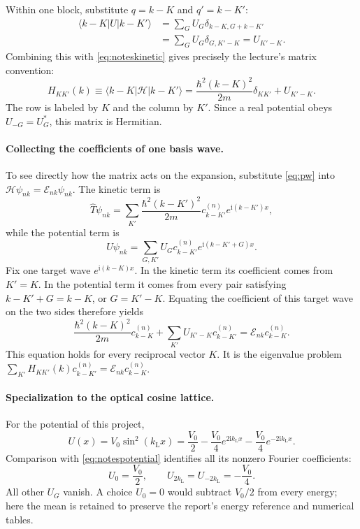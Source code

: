 \documentclass[11pt,oneside]{report}
\numberwithin{equation}{chapter}
\newcommand{\ii}{\mathrm i}
\begin{document}
Within one block, substitute $q=k-K$ and $q'=k-K'$:
\begin{align}
 \langle k-K|U|k-K'\rangle
 &=\sum_GU_G\delta_{k-K,G+k-K'}\nonumber\\
 &=\sum_GU_G\delta_{G,K'-K}=U_{K'-K}.
\end{align}
Combining this with \cref{eq:noteskinetic} gives precisely the lecture's matrix convention:
\begin{equation}\label{eq:notesmatrix}
 \boxed{H_{KK'}(k)\equiv\langle k-K|\mathcal H|k-K'\rangle
 =\frac{\hbar^2(k-K)^2}{2m}\delta_{KK'}+U_{K'-K}.}
\end{equation}
The row is labeled by $K$ and the column by $K'$. Since a real potential obeys $U_{-G}=U_G^*$, this matrix is Hermitian.

\paragraph{Collecting the coefficients of one basis wave.}
To see directly how the matrix acts on the expansion, substitute \cref{eq:pw} into $\mathcal H\psi_{nk}=\mathcal E_{nk}\psi_{nk}$. The kinetic term is
\begin{equation}
 \hat T\psi_{nk}=\sum_{K'}\frac{\hbar^2(k-K')^2}{2m}c^{(n)}_{k-K'}e^{\ii(k-K')x},
\end{equation}
while the potential term is
\begin{equation}
 U\psi_{nk}=\sum_{G,K'}U_Gc^{(n)}_{k-K'}e^{\ii(k-K'+G)x}.
\end{equation}
Fix one target wave $e^{\ii(k-K)x}$. In the kinetic term its coefficient comes from $K'=K$. In the potential term it comes from every pair satisfying $k-K'+G=k-K$, or $G=K'-K$. Equating the coefficient of this target wave on the two sides therefore yields
\begin{equation}\label{eq:notescoefficient}
 \boxed{\frac{\hbar^2(k-K)^2}{2m}c^{(n)}_{k-K}
 +\sum_{K'}U_{K'-K}c^{(n)}_{k-K'}=\mathcal E_{nk}c^{(n)}_{k-K}.}
\end{equation}
This equation holds for every reciprocal vector $K$. It is the eigenvalue problem $\sum_{K'}H_{KK'}(k)c^{(n)}_{k-K'}=\mathcal E_{nk}c^{(n)}_{k-K}$.

\paragraph{Specialization to the optical cosine lattice.}
For the potential of this project,
\begin{equation}
 U(x)=V_0\sin^2(k_{\mathrm L}x)=\frac{V_0}{2}
 -\frac{V_0}{4}e^{2\ii k_{\mathrm L}x}-\frac{V_0}{4}e^{-2\ii k_{\mathrm L}x}.
\end{equation}
Comparison with \cref{eq:notespotential} identifies all its nonzero Fourier coefficients:
\begin{equation}
 U_0=\frac{V_0}{2},\qquad U_{2k_{\mathrm L}}=U_{-2k_{\mathrm L}}=-\frac{V_0}{4}.
\end{equation}
All other $U_G$ vanish. A choice $U_0=0$ would subtract $V_0/2$ from every energy; here the mean is retained to preserve the report's energy reference and numerical tables.
\end{document}
